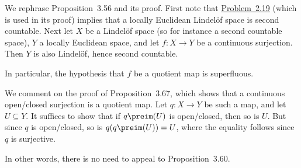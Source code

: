 \documentclass[article, a4paper, 11pt, oneside]{memoir}
\numberwithin{equation}{chapter}
\newcommand{\RNum}[1]{\uppercase\expandafter{\romannumeral #1\relax}}
\newcommand{\probref}[1]{%
    \hyperref[prob:#1]{Problem~#1}%
}
\theoremstyle{nonumberplain}
\begin{document}
\begin{remark}
    We rephrase Proposition~3.56 and its proof. First note that \probref{2.19} (which is used in its proof) implies that a locally Euclidean Lindelöf space is second countable. Next let $X$ be a Lindelöf space (so for instance a second countable space), $Y$ a locally Euclidean space, and let $f \colon X \to Y$ be a continuous surjection. Then $Y$ is also Lindelöf, hence second countable.

    In particular, the hypothesis that $f$ be a quotient map is superfluous.
\end{remark}


\begin{remark}
    We comment on the proof of Proposition~3.67, which shows that a continuous open/closed surjection is a quotient map. Let $q \colon X \to Y$ be such a map, and let $U \subseteq Y$. It suffices to show that if $q\preim(U)$ is open/closed, then so is $U$. But since $q$ is open/closed, so is $q(q\preim(U)) = U$, where the equality follows since $q$ is surjective.

    In other words, there is no need to appeal to Proposition~3.60.
\end{remark}

\newcommand{\congto}{\xrightarrow{\raisebox{-1ex}[0ex][0ex]{$\sim$}}}
\end{document}
